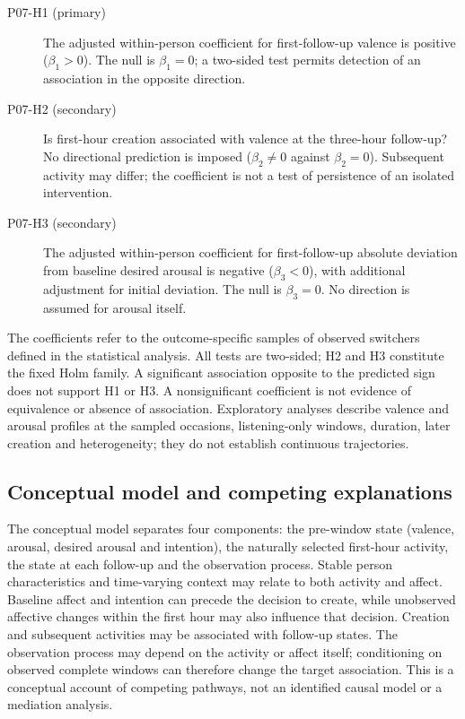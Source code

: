 \documentclass[11pt]{article}
\begin{document}
\begin{description}
\item[P07-H1 (primary)] The adjusted within-person coefficient for first-follow-up valence is positive ($\beta_1>0$). The null is $\beta_1=0$; a two-sided test permits detection of an association in the opposite direction.
\item[P07-H2 (secondary)] Is first-hour creation associated with valence at the three-hour follow-up? No directional prediction is imposed ($\beta_2\ne 0$ against $\beta_2=0$). Subsequent activity may differ; the coefficient is not a test of persistence of an isolated intervention.
\item[P07-H3 (secondary)] The adjusted within-person coefficient for first-follow-up absolute deviation from baseline desired arousal is negative ($\beta_3<0$), with additional adjustment for initial deviation. The null is $\beta_3=0$. No direction is assumed for arousal itself.
\end{description}
The coefficients refer to the outcome-specific samples of observed switchers defined in the statistical analysis. All tests are two-sided; H2 and H3 constitute the fixed Holm family. A significant association opposite to the predicted sign does not support H1 or H3. A nonsignificant coefficient is not evidence of equivalence or absence of association. Exploratory analyses describe valence and arousal profiles at the sampled occasions, listening-only windows, duration, later creation and heterogeneity; they do not establish continuous trajectories.

\subsection{Conceptual model and competing explanations}
The conceptual model separates four components: the pre-window state (valence, arousal, desired arousal and intention), the naturally selected first-hour activity, the state at each follow-up and the observation process. Stable person characteristics and time-varying context may relate to both activity and affect. Baseline affect and intention can precede the decision to create, while unobserved affective changes within the first hour may also influence that decision. Creation and subsequent activities may be associated with follow-up states. The observation process may depend on the activity or affect itself; conditioning on observed complete windows can therefore change the target association. This is a conceptual account of competing pathways, not an identified causal model or a mediation analysis.
\end{document}
